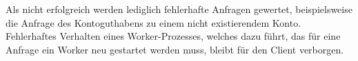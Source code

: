 Als nicht erfolgreich werden lediglich fehlerhafte Anfragen gewertet, beispielsweise die Anfrage des Kontoguthabens zu einem nicht existierendem Konto. Fehlerhaftes Verhalten eines Worker-Prozesses, welches dazu führt, das für eine Anfrage ein Worker neu gestartet werden muss, bleibt für den Client verborgen.






















